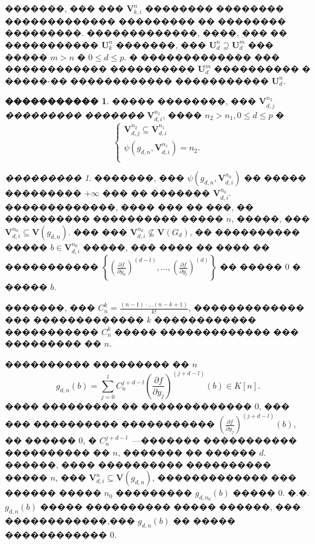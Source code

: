 \documentclass[16pt]{article}
\theoremstyle{plain}
\theoremstyle{definition}
\newtheorem{definition}[theorem]{�����������}
\theoremstyle{remark}
\newtheorem{remark}[theorem]{���������}
\begin{document}
�������, ��� ��� $\mathbf{V}_{k,i}^n$ �������� �������� ������������� ��������� �� �������� ���������. �������������, ����, ��� �� ����������� $\mathbf{U}_{k}^n$ �������, ���  $\mathbf{U}_{d}^n\supseteq \mathbf{U}_{d}^m$ ��� ����� $m >n$ � $0\leqslant d\leqslant p$. � �������������
��� ������������ ���������� $\mathbf{U}_{d}^m$ ���������� � �����-�� ������������ ����������� $\mathbf{U}_{d}^n$.



\begin{definition}
����� ��������, ��� $\mathbf{V}_{d,j}^{n_2}$ {\it ��������� �������} $\mathbf{V}_{d,i}^{n_1}$, ���� $n_2>n_1, 0\leqslant d\leqslant p$ �
$$
\left\{
 \begin{aligned}
 \mathbf{V}_{d,j}^{n_2}\subseteq \mathbf{V}_{d,i}^{n_1}\\
 \psi(g_{d,n},\mathbf{V}_{d,i}^{n_1})=n_2.\\
 \end{aligned}
 \right.
$$
\end{definition}

\begin{remark}\label{remark:o_konechnosti_psi}
�������, ��� $\psi(g_{d,n},\mathbf{V}_{d,i}^{n_0})$ �� ����� ��������� $+\infty$  ��� �� ������� $\mathbf{V}_{d,i}^{n_0}$. �������������, ���� ��� �� ���, �� ���������� ���������� ����� $n$, �����, ��� $\mathbf{V}_{d,i}^{n_0}\subseteq \mathbf{V}(g_{d,n})$. ��� ��� $\mathbf{V}_{d,i}^{n_0} \not\subseteq \mathbf{V}(G_d)$, �� ���������� ����� $b\in \mathbf{V}_{d,i}^{n_0}$ �����, ��� ���� �� ���� �� ����������� $\left\{\left(\frac{\partial f}{\partial y_0}\right)^{(d-l)},\ldots, \left(\frac{\partial f}{\partial y_l}\right)^{(d)} \right\}$ �� ����� 0 � ����� $b$.

�������, ��� $C_n^k=\frac{(n-1)\cdot\ldots(n-k+1)}{k!}$, ������������� ��� ������������� $k$ ������������ ����������� $C_n^k$ ����� ������������� ��� ��������� �� $n$.

���������� ��������� �� $n$
$$
g_{d,n}(b)=\sum\limits_{j=0}^{l}C_n^{j+d - l }\left(\frac{\partial f}{\partial y_j}\right)^{(j+d - l)}(b)\in K[n].
$$
���� ��������� �� ������������� 0, ��� ��� ���������� ����������� $\left(\frac{\partial f}{\partial y_j}\right)^{(j+d - l)}(b)$, �� ������ 0, � $C_n^{j+d - l }$~---������� ����������� ���������� �� $n$, ������� �� ������ $d$. ������, ���� ���������� ���������� ����� $n$, ��� $\mathbf{V}_{d,i}^n\subseteq \mathbf{V}(g_{d,n})$, ������������� ��� ������ ����� $n_0$ ��������� $g_{d,n_0}(b)$ ����� 0. �.�. $g_{d,n}(b)$ ����� ���������� ����� ������, ��� ������������,��� $g_{d,n}(b)$ �� ����� ������������ 0.
\end{remark}
\end{document}
